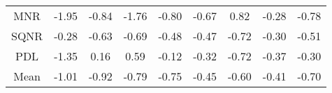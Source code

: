 \documentclass[11pt,a4paper]{report}
\begin{document}
\begin{longtable}{ | c || c | c | c | c | c | c | c || c |}
MNR &  \cellcolor[HTML]{FFCFCF} -1.95 &  \cellcolor[HTML]{FFE7E7} -0.84 &  \cellcolor[HTML]{FFCFCF} -1.76 &  \cellcolor[HTML]{FFE7E7} -0.80 &  \cellcolor[HTML]{FFEFEF} -0.67 &  \cellcolor[HTML]{E7E7FF} 0.82 &  \cellcolor[HTML]{FFF7F7} -0.28 &  \cellcolor[HTML]{FFEFEF} -0.78 \\
SQNR &  \cellcolor[HTML]{FFF7F7} -0.28 &  \cellcolor[HTML]{FFEFEF} -0.63 &  \cellcolor[HTML]{FFEFEF} -0.69 &  \cellcolor[HTML]{FFEFEF} -0.48 &  \cellcolor[HTML]{FFF7F7} -0.47 &  \cellcolor[HTML]{FFEFEF} -0.72 &  \cellcolor[HTML]{FFF7F7} -0.30 &  \cellcolor[HTML]{FFEFEF} -0.51 \\
PDL &  \cellcolor[HTML]{FFDFDF} -1.35 &  \cellcolor[HTML]{F7F7FF} 0.16 &  \cellcolor[HTML]{EFEFFF} 0.59 &  \cellcolor[HTML]{FFFFFF} -0.12 &  \cellcolor[HTML]{FFF7F7} -0.32 &  \cellcolor[HTML]{FFEFEF} -0.72 &  \cellcolor[HTML]{FFF7F7} -0.37 &  \cellcolor[HTML]{FFF7F7} -0.30 \\
\hline
\hline
Mean  &  \cellcolor[HTML]{FFE7E7} -1.01 &  \cellcolor[HTML]{FFE7E7} -0.92 &  \cellcolor[HTML]{FFEFEF} -0.79 &  \cellcolor[HTML]{FFEFEF} -0.75 &  \cellcolor[HTML]{FFF7F7} -0.45 &  \cellcolor[HTML]{FFEFEF} -0.60 &  \cellcolor[HTML]{FFF7F7} -0.41 &  \cellcolor[HTML]{FFEFEF} -0.70 \\
\hline
\end{longtable}
\end{document}
